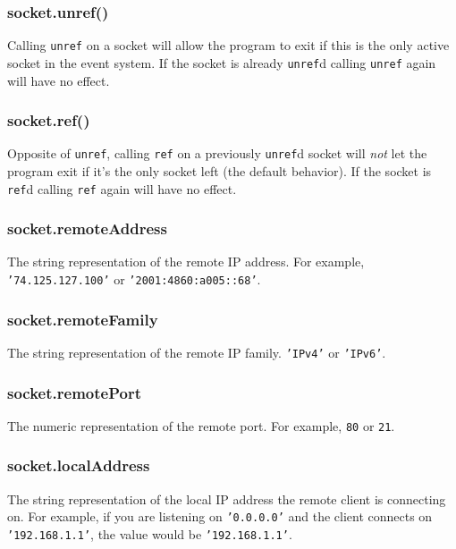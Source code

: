 \subsubsection{socket.unref()}\label{socket.unref}

Calling \texttt{unref} on a socket will allow the program to exit if
this is the only active socket in the event system. If the socket is
already \texttt{unref}d calling \texttt{unref} again will have no
effect.

\subsubsection{socket.ref()}\label{socket.ref}

Opposite of \texttt{unref}, calling \texttt{ref} on a previously
\texttt{unref}d socket will \emph{not} let the program exit if it's the
only socket left (the default behavior). If the socket is \texttt{ref}d
calling \texttt{ref} again will have no effect.

\subsubsection{socket.remoteAddress}\label{socket.remoteaddress}

The string representation of the remote IP address. For example,
\texttt{'74.125.127.100'} or \texttt{'2001:4860:a005::68'}.

\subsubsection{socket.remoteFamily}\label{socket.remotefamily}

The string representation of the remote IP family. \texttt{'IPv4'} or
\texttt{'IPv6'}.

\subsubsection{socket.remotePort}\label{socket.remoteport}

The numeric representation of the remote port. For example, \texttt{80}
or \texttt{21}.

\subsubsection{socket.localAddress}\label{socket.localaddress}

The string representation of the local IP address the remote client is
connecting on. For example, if you are listening on \texttt{'0.0.0.0'}
and the client connects on \texttt{'192.168.1.1'}, the value would be
\texttt{'192.168.1.1'}.

